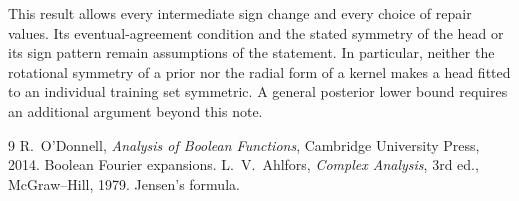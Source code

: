 \documentclass[11pt]{article}
\theoremstyle{remark}\newtheorem{remark}[theorem]{Remark}
\begin{document}
This result allows every intermediate sign change and every choice of
repair values. Its eventual-agreement condition and the stated symmetry
of the head or its sign pattern remain assumptions of the statement. In particular,
neither the rotational symmetry of a prior nor the radial form of a
kernel makes a head fitted to an individual training set symmetric.
A general posterior lower bound requires an additional argument beyond
this note.

\begin{thebibliography}{9}
 R.~O'Donnell, \emph{Analysis of Boolean Functions},
Cambridge University Press, 2014. Boolean Fourier expansions.
 L.~V.~Ahlfors, \emph{Complex Analysis}, 3rd ed.,
McGraw--Hill, 1979. Jensen's formula.
\end{thebibliography}
\end{document}
